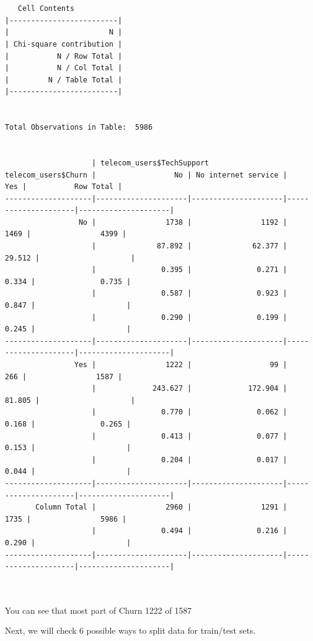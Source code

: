 \documentclass[
  letterpaper,
  DIV=11,
  numbers=noendperiod]{scrreprt}
\begin{document}
\begin{verbatim}

 
   Cell Contents
|-------------------------|
|                       N |
| Chi-square contribution |
|           N / Row Total |
|           N / Col Total |
|         N / Table Total |
|-------------------------|

 
Total Observations in Table:  5986 

 
                    | telecom_users$TechSupport 
telecom_users$Churn |                  No | No internet service |                 Yes |           Row Total | 
--------------------|---------------------|---------------------|---------------------|---------------------|
                 No |                1738 |                1192 |                1469 |                4399 | 
                    |              87.892 |              62.377 |              29.512 |                     | 
                    |               0.395 |               0.271 |               0.334 |               0.735 | 
                    |               0.587 |               0.923 |               0.847 |                     | 
                    |               0.290 |               0.199 |               0.245 |                     | 
--------------------|---------------------|---------------------|---------------------|---------------------|
                Yes |                1222 |                  99 |                 266 |                1587 | 
                    |             243.627 |             172.904 |              81.805 |                     | 
                    |               0.770 |               0.062 |               0.168 |               0.265 | 
                    |               0.413 |               0.077 |               0.153 |                     | 
                    |               0.204 |               0.017 |               0.044 |                     | 
--------------------|---------------------|---------------------|---------------------|---------------------|
       Column Total |                2960 |                1291 |                1735 |                5986 | 
                    |               0.494 |               0.216 |               0.290 |                     | 
--------------------|---------------------|---------------------|---------------------|---------------------|

 
\end{verbatim}

You can see that most part of Churn 1222 of 1587

Next, we will check 6 possible ways to split data for train/test sets.
\end{document}
